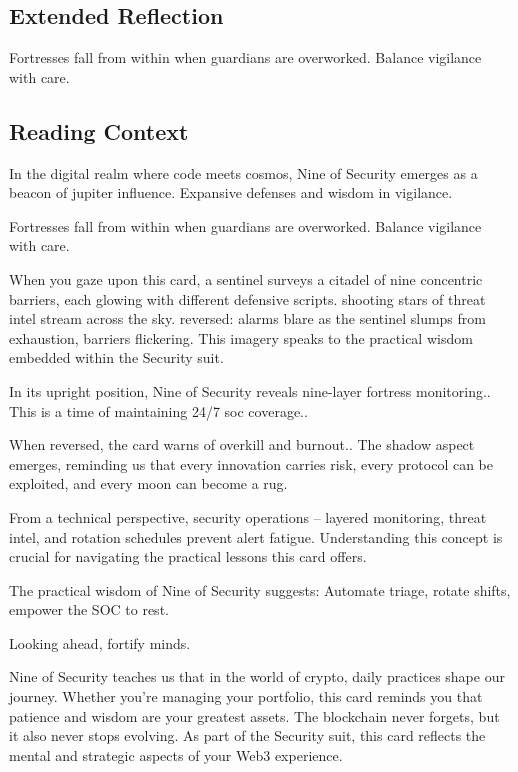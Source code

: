 \documentclass[11pt,oneside]{book}
\begin{document}
\begin{minipage}[t]{0.55\textwidth}
  \subsection*{Extended Reflection}
  Fortresses fall from within when guardians are overworked. Balance vigilance with care.

  \subsection*{Reading Context}
  In the digital realm where code meets cosmos, Nine of Security emerges as a beacon of jupiter influence. Expansive defenses and wisdom in vigilance.

  Fortresses fall from within when guardians are overworked. Balance vigilance with care.

  When you gaze upon this card, a sentinel surveys a citadel of nine concentric barriers, each glowing with different defensive scripts. shooting stars of threat intel stream across the sky. reversed: alarms blare as the sentinel slumps from exhaustion, barriers flickering. This imagery speaks to the practical wisdom embedded within the Security suit.

  In its upright position, Nine of Security reveals nine-layer fortress monitoring.. This is a time of maintaining 24/7 soc coverage..

  When reversed, the card warns of overkill and burnout.. The shadow aspect emerges, reminding us that every innovation carries risk, every protocol can be exploited, and every moon can become a rug.

  From a technical perspective, security operations – layered monitoring, threat intel, and rotation schedules prevent alert fatigue. Understanding this concept is crucial for navigating the practical lessons this card offers.

  The practical wisdom of Nine of Security suggests: Automate triage, rotate shifts, empower the SOC to rest.

  Looking ahead, fortify minds.

  Nine of Security teaches us that in the world of crypto, daily practices shape our journey. Whether you're managing your portfolio, this card reminds you that patience and wisdom are your greatest assets. The blockchain never forgets, but it also never stops evolving. As part of the Security suit, this card reflects the mental and strategic aspects of your Web3 experience.

\end{minipage}
\end{document}
